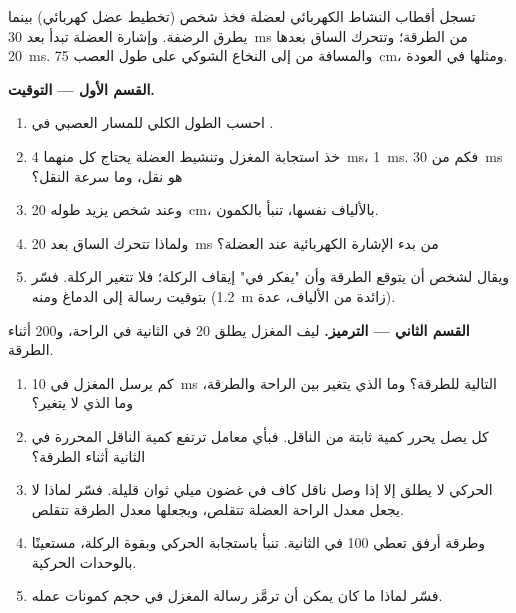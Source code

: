 \begin{problem}
\label{pb:g12:stretch-reflex:1}
تسجل أقطاب النشاط الكهربائي لعضلة فخذ شخص (تخطيط عضل كهربائي) بينما
يطرق  الرضفة. وإشارة العضلة تبدأ بعد \qty{30}{ms} من الطرقة؛ وتتحرك
الساق بعدها \qty{20}{ms}. والمسافة من  إلى النخاع الشوكي على طول
العصب \qty{75}{cm}، ومثلها في العودة.

\medskip
\noindent\textbf{القسم الأول --- التوقيت.}
\begin{enumerate}
  \item احسب الطول الكلي للمسار العصبي في .
  \item خذ استجابة المغزل وتنشيط العضلة يحتاج كل منهما \qty{4}{ms}،
         \qty{1}{ms}. فكم من \qty{30}{ms} هو نقل، وما سرعة
        النقل؟
  \item وعند شخص يزيد طوله \qty{20}{cm}، بالألياف نفسها، تنبأ بالكمون.
  \item ولماذا تتحرك الساق بعد \qty{20}{ms} من بدء الإشارة الكهربائية
        عند العضلة؟
  \item ويقال لشخص أن يتوقع الطرقة وأن "يفكر في" إيقاف الركلة؛ فلا
        تتغير الركلة. فسّر بتوقيت رسالة إلى الدماغ ومنه (\qty{1.2}{m}
        زائدة من الألياف،  عدة).
\end{enumerate}

\medskip
\noindent\textbf{القسم الثاني --- الترميز.}
ليف المغزل يطلق 20  في الثانية في الراحة، و200 أثناء الطرقة.
\begin{enumerate}[resume]
  \item كم  يرسل المغزل في \qty{10}{ms} التالية للطرقة؟ وما
        الذي يتغير بين الراحة والطرقة، وما الذي لا يتغير؟
  \item كل  يصل  يحرر كمية ثابتة من الناقل. فبأي معامل
        ترتفع كمية الناقل المحررة في الثانية أثناء الطرقة؟
  \item {} الحركي لا يطلق إلا إذا وصل ناقل كاف في غضون ميلي ثوان
        قليلة. فسّر لماذا لا يجعل معدل الراحة العضلة تتقلص، ويجعلها
        معدل الطرقة تتقلص.
  \item وطرقة أرفق تعطي 100 في الثانية. تنبأ باستجابة  الحركي
        وبقوة الركلة، مستعينًا بالوحدات الحركية.
  \item فسّر لماذا ما كان يمكن أن ترمَّز رسالة المغزل في حجم كمونات
        عمله.
\end{enumerate}


\end{problem}
